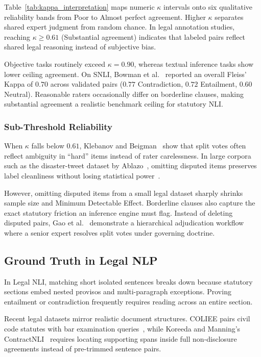     Table~\ref{tab:kappa_interpretation} maps numeric $\kappa$ intervals onto six qualitative reliability bands from Poor to Almost perfect agreement. Higher $\kappa$ separates shared expert judgment from random chance. In legal annotation studies, reaching $\kappa \ge 0.61$ (Substantial agreement) indicates that labeled pairs reflect shared legal reasoning instead of subjective bias.

    Objective tasks routinely exceed $\kappa = 0.90$, whereas textual inference tasks show lower ceiling agreement. On SNLI, Bowman et al.~\cite{bowman2015snli} reported an overall Fleiss' Kappa of $0.70$ across validated pairs ($0.77$ Contradiction, $0.72$ Entailment, $0.60$ Neutral). Reasonable raters occasionally differ on borderline clauses, making substantial agreement a realistic benchmark ceiling for statutory NLI.

        \subsubsection{Sub-Threshold Reliability}
        When $\kappa$ falls below $0.61$, Klebanov and Beigman~\cite{klebanov2009from} show that split votes often reflect ambiguity in ``hard'' items instead of rater carelessness. In large corpora such as the disaster-tweet dataset by Ablazo~\cite{ablazo2019designing}, omitting disputed items preserves label cleanliness without losing statistical power~\cite{klebanov2009from}.
        
        However, omitting disputed items from a small legal dataset sharply shrinks sample size and Minimum Detectable Effect. Borderline clauses also capture the exact statutory friction an inference engine must flag. Instead of deleting disputed pairs, Gao et al.~\cite{gao2022hierarchical} demonstrate a hierarchical adjudication workflow where a senior expert resolves split votes under governing doctrine.

    \subsection{Ground Truth in Legal NLP}
    In Legal NLI, matching short isolated sentences breaks down because statutory sections embed nested provisos and multi-paragraph exceptions. Proving entailment or contradiction frequently requires reading across an entire section.

    Recent legal datasets mirror realistic document structures. COLIEE pairs civil code statutes with bar examination queries~\cite{rabelo2022coliee}, while Koreeda and Manning's ContractNLI~\cite{koreeda2021contract} requires locating supporting spans inside full non-disclosure agreements instead of pre-trimmed sentence pairs.

